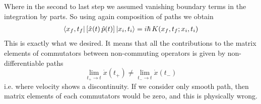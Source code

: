 \documentclass[../main/main.tex]{subfiles}
\begin{document}
Where in the second to last step we assumed vanishing boundary terms in the integration by parts. 
So using again composition of paths we obtain
\begin{align*}
\bra{x_f,t_f}\left[\hat x(t)\,\hat p(t)\right]\ket{x_i,t_i}=i\hbar \,K(x_f,t_f;x_i,t_i)
\end{align*}
This is exactly what we desired. It means that all the contributions to the matrix elements of commutators between non-commuting operators is given by non-differentiable paths
\[\lim_{ t_+\to t}\dot x(t_+)\neq\lim_{ t_-\to t}\dot x(t_-)\]
i.e. where velocity shows a discontinuity. If we consider only smooth path, then matrix elements of each commutators would be zero, and this is physically wrong. 
\end{document}
